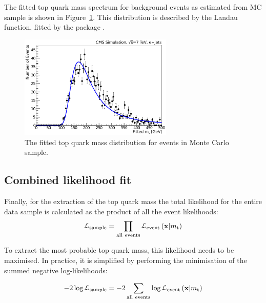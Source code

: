 The fitted top quark mass spectrum for background events as estimated from \WpJets MC sample is shown in
Figure~\ref{fig:background_wjets_fitted_top_mass}. This distribution is described by the Landau function, fitted by the 
\ROOT package \autocite{Landau}.

\begin{figure}[!htpb]
\begin{center}
	\includegraphics[width=0.65\textwidth]{background_wjets_fitted_top_mass}
	\caption{\label{fig:background_wjets_fitted_top_mass}
	The fitted top quark mass distribution for \ttbar events in \WpJets Monte Carlo sample.}
\end{center}
\end{figure}

\subsection{Combined likelihood fit}
\label{ss_top_mass:likelihood_fit}
Finally, for the extraction of the top quark mass the total likelihood for the entire data sample is calculated as the
product of all the event likelihoods:
\begin{equation}
\mathcal{L}_{\rm sample} = \prod_{\rm all~events}
\mathcal{L}_\textrm{event} \left(\mathbf{x}|m_\mathrm{t} \right)
\label{eq:CombinedLikelihood}
\end{equation}

To extract the most probable top quark mass, this likelihood needs to be maximised. In practice, it is simplified by
performing the minimisation of the summed negative log-likelihoods:

\begin{equation}
 -2\log{\mathcal{L}_{\rm sample}} = -2 \sum_{\rm all~events} \log{\mathcal{L}_\textrm{event} \left(\mathbf{x}|\mtop
 \right)}
\label{eq:CombinedLogLikelihood}
\end{equation}

